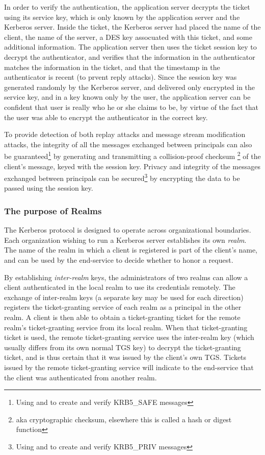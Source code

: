 In order to verify the authentication, the application server decrypts
the ticket using its service key, which is only known by the application
server and the Kerberos server.  Inside the ticket, the Kerberos server
had placed the name of the client, the name of the server, a DES key
assocuated with this ticket, and some additional information.  The
application server then uses the ticket session key to decrypt the
authenticator, and verifies that the information in the authenticator
matches the information in the ticket, and that the timestamp in the
authenticator is recent (to prvent reply attacks).  Since the session
key was generated randomly by the Kerberos server, and delivered only
encrypted in the service key, and in a key known only by the user, the
application server can be confident that user is really who he or she
claims to be, by virtue of the fact that the user was able to encrypt
the authenticator in the correct key.

To provide detection of both replay
attacks and message stream modification attacks, the integrity of all
the messages exchanged between principals can also be 
guaranteed\footnote{Using
 and  to create and
verify KRB5_SAFE messages} by generating and transmitting a
collision-proof checksum \footnote{aka cryptographic checksum,
elsewhere this is called a hash or digest function} of the client's
message, keyed with the session key.  Privacy and integrity of the
messages exchanged between principals can be secured\footnote{Using
 and  to create and
verify KRB5_PRIV messages} by encrypting the data to be passed using
the session key.

\subsubsection{The purpose of Realms}

The Kerberos protocol is designed to operate across organizational
boundaries.   Each organization wishing to run a Kerberos
server establishes its own {\em realm}.  The name of the realm in which a
client is registered is part of the client's name, and can be used by the
end-service to decide whether to honor a request.

By establishing {\em inter-realm} keys, the administrators of two
realms can allow a client authenticated in the local realm to use its
credentials remotely.  The exchange of inter-realm keys (a separate
key may be used for each direction) registers the ticket-granting
service of each realm as a principal in the other realm.  A client is
then able to obtain a ticket-granting ticket for the remote realm's
ticket-granting service from its local realm.  When that
ticket-granting ticket is used, the remote ticket-granting service
uses the inter-realm key (which usually differs from its own normal
TGS key) to decrypt the ticket-granting ticket, and is thus certain
that it was issued by the client's own TGS. Tickets issued by the
remote ticket-granting service will indicate to the end-service that
the client was authenticated from another realm.   


